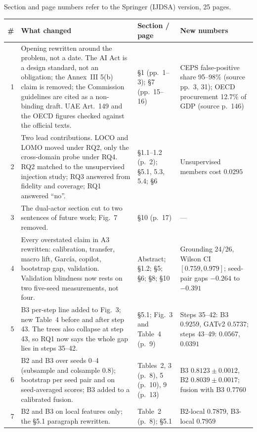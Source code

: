 \documentclass[9pt]{extarticle}
\begin{document}
\hfill
\small Section and page numbers refer to the Springer (IJDSA) version, 25 pages.\par
\vspace{4pt}
\small
\noindent\begin{tabularx}{\textwidth}{@{}r>{\raggedright\arraybackslash}X>{\raggedright\arraybackslash}p{}>{\raggedright\arraybackslash}p{}@{}}
\toprule
\# & What changed & Section / page & New numbers \\
\midrule
1 & Opening rewritten around the problem, not a date. The AI Act is a design standard, not an obligation; the Annex~III 5(b) claim is removed; the Commission guidelines are cited as a non-binding draft. UAE Art.~149 and the OECD figures checked against the official texts. & \S1 (pp.~1--3); \S7 (pp.~15--16) & CEPS false-positive share 95--98\% (source pp.~3, 31); OECD procurement 12.7\% of GDP (source p.~146) \\
2 & Two lead contributions. LOCO and LOMO moved under RQ2, only the cross-domain probe under RQ4. RQ2 matched to the unsupervised injection study; RQ3 answered from fidelity and coverage; RQ1 answered ``no''. & \S1.1--1.2 (p.~2); \S5.1, 5.3, 5.4; \S6 & Unsupervised members cost $0.0295$ \\
3 & The dual-actor section cut to two sentences of future work; Fig.~7 removed. & \S10 (p.~17) & --- \\
4 & Every overstated claim in A3 rewritten: calibration, transfer, macro lift, Garc\'ia, copilot, bootstrap gap, validation. Validation blindness now rests on two five-seed measurements, not four. & Abstract; \S1.2; \S5; \S6; \S8; \S10 & Grounding 24/26, Wilson CI $[0.759, 0.979]$; seed-pair gaps $-0.264$ to $-0.391$ \\
5 & B3 per-step line added to Fig.~3; new Table~4 before and after step 43. The trees also collapse at step 43, so RQ1 now says the whole gap lies in steps 35--42. & \S5.1; Fig.~3 and Table~4 (p.~9) & Steps 35--42: B3 $0.9259$, GATv2 $0.5737$; steps 43--49: $0.0567$, $0.0391$ \\
6 & B2 and B3 over seeds 0--4 (subsample and colsample 0.8); bootstrap per seed pair and on seed-averaged scores; B3 added to a calibrated fusion. & Tables~2, 3 (p.~8), 5 (p.~10), 9 (p.~13) & B3 $0.8123 \pm 0.0012$, B2 $0.8039 \pm 0.0017$; fusion with B3 $0.7760$ \\
7 & B2 and B3 on local features only; the \S5.1 paragraph rewritten. & Table~2 (p.~8); \S5.1 & B2-local $0.7879$, B3-local $0.7959$ \\

\end{tabularx}
\end{document}
